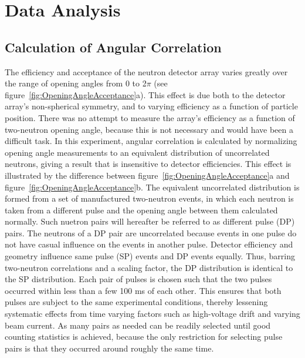 \section{Data Analysis}
\label{Analysis}
\subsection{Calculation of Angular Correlation}
The efficiency and acceptance of the neutron detector array varies greatly over the range of opening angles from 0 to 2$\pi$ (see figure~\ref{fig:OpeningAngleAcceptance}a).
This effect is due both to the detector array's non-spherical symmetry, and to varying efficiency as a function of particle position.
There was no attempt to measure the array's efficiency as a function of two-neutron opening angle, because this is not necessary and would have been a difficult task.
In this experiment, angular correlation is calculated by normalizing opening angle measurements to an equivalent distribution of uncorrelated neutrons, giving a result that is insensitive to detector efficiencies.
This effect is illustrated by the difference between figure~\ref{fig:OpeningAngleAcceptance}a and figure~\ref{fig:OpeningAngleAcceptance}b.
The equivalent uncorrelated distribution is formed from a set of manufactured two-neutron events, in which each neutron is taken from a different pulse and the opening angle between them calculated normally.
Such nuetron pairs will hereafter be referred to as different pulse (DP) pairs.
The neutrons of a DP pair are uncorrelated because events in one pulse do not have casual influence on the events in another pulse.
Detector efficiency and geometry influence same pulse (SP) events and DP events equally.
Thus, barring two-neutron correlations and a scaling factor, the DP distribution is identical to the SP distribution.
Each pair of pulses is chosen such that the two pulses occurred within less than a few 100 ms of each other.
This ensures that both pulses are subject to the same experimental conditions, thereby lessening systematic effects from time varying factors such as high-voltage drift and varying beam current.
As many pairs as needed can be readily selected until good counting statistics is achieved, because the only restriction for selecting pulse pairs is that they occurred around roughly the same time.
